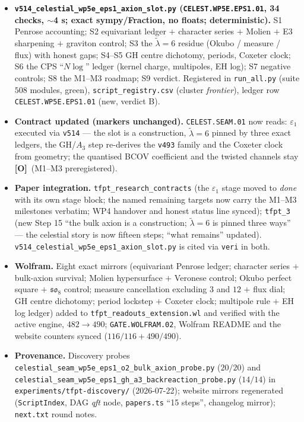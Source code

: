 \documentclass[11pt]{article}
\providecommand{\mO}{\textbf{[O]}}\providecommand{\mX}{\textbf{[X]}}
\begin{document}
\begin{itemize}[leftmargin=1.5em]
\item \textbf{\texttt{v514\_celestial\_wp5e\_eps1\_axion\_slot.py} (\texttt{CELEST.WP5E.EPS1.01},
34 checks, $\sim$4 s; exact sympy/Fraction, no floats; deterministic).} S1 Penrose accounting; S2
equivariant ledger $+$ character series $+$ Molien $+$ E3 sharpening $+$ graviton control; S3 the
$\tilde\lambda=6$ residue (Okubo / measure / flux) with honest gaps; S4--S5 GH centre dichotomy,
periods, Coxeter clock; S6 the CPS ``$N\log$'' ledger (kernel charge, multipoles, EH log); S7
negative controls; S8 the M1--M3 roadmap; S9 verdict. Registered in \texttt{run\_all.py} (suite
$508$ modules, green), \texttt{script\_registry.csv} (cluster \emph{frontier}), ledger row
\texttt{CELEST.WP5E.EPS1.01} (new, verdict B).
\item \textbf{Contract updated (markers unchanged).} \texttt{CELEST.SEAM.01} now reads:
$\varepsilon_1$ executed via \texttt{v514} --- the slot is a construction, $\tilde\lambda=6$
pinned by three exact ledgers, the GH/$A_3$ step re-derives the \texttt{v493} family and the
Coxeter clock from geometry; the quantised BCOV coefficient and the twisted channels stay \mO\
(M1--M3 preregistered).
\item \textbf{Paper integration.} \texttt{tfpt\_research\_contracts} (the $\varepsilon_1$ stage
moved to \emph{done} with its own stage block; the named remaining targets now carry the M1--M3
milestones verbatim; WP4 handover and honest status line synced); \texttt{tfpt\_3} (new Step 15
``the bulk axion is a construction; $\tilde\lambda=6$ is pinned three ways'' --- the celestial
story is now fifteen steps; ``what remains'' updated).
\texttt{v514\_celestial\_wp5e\_eps1\_axion\_slot.py} is cited via \texttt{veri} in both.
\item \textbf{Wolfram.} Eight exact mirrors (equivariant Penrose ledger; character series $+$
bulk-axion survival; Molien hypersurface $+$ Veronese control; Okubo perfect square $+$
$\mathfrak{so}_8$ control; measure cancellation excluding $3$ and $12$ $+$ flux dial; GH centre
dichotomy; period lockstep $+$ Coxeter clock; multipole rule $+$ EH log ledger) added to
\texttt{tfpt\_readouts\_extension.wl} and verified with the active engine, $482\to490$;
\texttt{GATE.WOLFRAM.02}, Wolfram README and the website counters synced ($116/116+490/490$).
\item \textbf{Provenance.} Discovery probes
\texttt{celestial\_seam\_}\allowbreak\texttt{wp5e\_eps1\_}\allowbreak\texttt{o2\_bulk\_}\allowbreak\texttt{axion\_probe.py}
($20/20$) and
\texttt{celestial\_seam\_}\allowbreak\texttt{wp5e\_eps1\_}\allowbreak\texttt{gh\_a3\_}\allowbreak\texttt{backreaction\_probe.py}
($14/14$) in \texttt{experiments/tfpt-discovery/} (2026-07-22); website mirrors regenerated
(\texttt{ScriptIndex}, DAG \emph{qft} node, \texttt{papers.ts} ``15 steps'', changelog mirror);
\texttt{next.txt} round notes.
\end{itemize}
\end{document}
